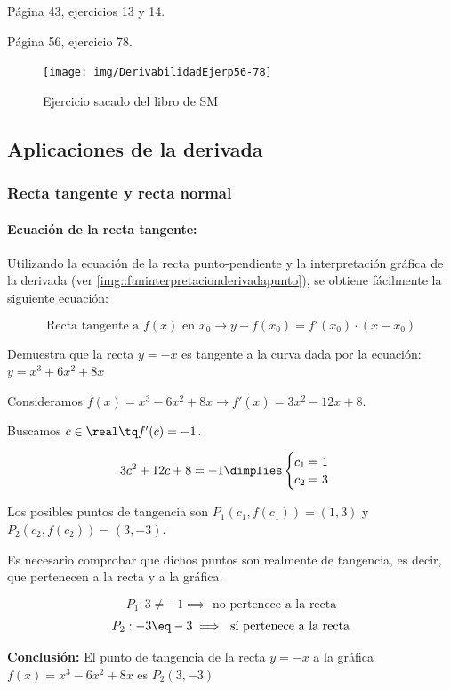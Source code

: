 \begin{problem}
Página 43, ejercicios 13 y 14.
\solution
\end{problem}

\begin{problem}
Página 56, ejercicio 78.
\solution
\begin{figure}[h!]
\centering
\texttt{[image: img/DerivabilidadEjerp56-78]}
\label{ejercicioDerivabilidad}
\caption{Ejercicio sacado del libro de SM}
\end{figure}
\end{problem}


\subsection{Aplicaciones de la derivada}

\subsubsection{Recta tangente y recta normal}

\paragraph{Ecuación de la recta tangente:} Utilizando la ecuación de la recta punto-pendiente y la interpretación gráfica de la derivada (ver \ref{img::funinterpretacionderivadapunto}), se obtiene fácilmente la siguiente ecuación:

\begin{mdframed}
	\begin{equation}
		\label{eq::rectatangente}
		\text{Recta tangente a }f(x)\text{ en }x_0 \to y-f(x_0) = f'(x_0)·(x-x_0)
	\end{equation}
\end{mdframed}

\begin{problem}
Demuestra que la recta $y=-x$ es tangente a la curva dada por la ecuación: $y=x^3+6x^2+8x$
\solution

Consideramos $f(x) = x^3-6x^2+8x \to f'(x) = 3x^2-12x+8$.

Buscamos $c\in\real\tq f'(c) = -1$.

\[
	3c^2+12c+8=-1 \dimplies \begin{cases}c_1 = 1\\c_2=3\end{cases}
\]

Los posibles puntos de tangencia son $P_1(c_1,f(c_1)) = (1,3)$ y $P_2(c_2,f(c_2)) = (3,-3)$.

Es necesario comprobar que dichos puntos son realmente de tangencia, es decir, que pertenecen a la recta y a la gráfica.

\[P_1: 3\neq -1 \implies \text{ no pertenece a la recta}\]
\[P_2: -3\eq -3 \implies \text{ sí pertenece a la recta}\]

\textbf{Conclusión: } El punto de tangencia de la recta $y=-x$ a la gráfica $f(x) = x^3-6x^2+8x$ es $P_2(3,-3)$
\end{problem}

